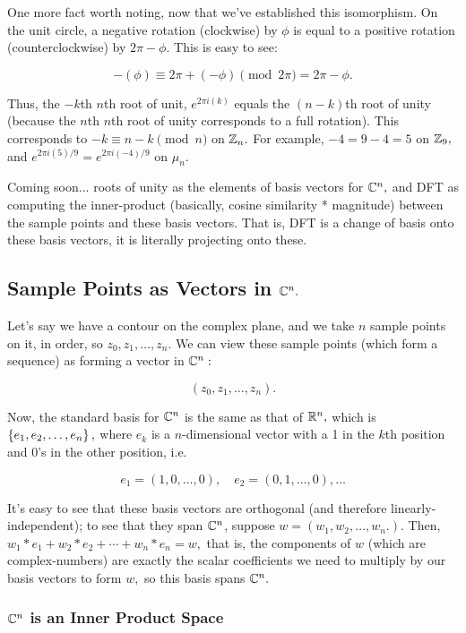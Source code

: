 \documentclass{article}
\begin{document}
One more fact worth noting, now that we've established this isomorphism. On the unit circle, a negative rotation (clockwise) by $\phi$ is equal to a positive rotation (counterclockwise) by $2 \pi - \phi.$ This is easy to see:

\[ -(\phi) \equiv 2 \pi + (-\phi) \pmod{2 \pi} = 2 \pi - \phi. \]

Thus, the $-k$th $n$th root of unit, $e^{2 \pi i (k)}$ equals the $(n - k)$th root of unity (because the $n$th $n$th root of unity corresponds to a full rotation). This corresponds to $-k \equiv n - k \pmod{n}$ on $\mathbb{Z}_n.$ For example, $-4 = 9 - 4 = 5$ on $\mathbb{Z}_9,$ and $e^{2 \pi i (5)/9} = e^{2 \pi i (-4)/9}$ on $\mu_{n}.$

Coming soon... roots of unity as the elements of basis vectors for $\mathbb{C}^n,$ and DFT as computing the \@{inner-product} (basically, cosine similarity * magnitude) between the sample points and these basis vectors. That is, DFT is a change of basis onto these basis vectors, it is literally projecting onto these.

\subsection{Sample Points as Vectors in $\mathbb{C}^n.$}

Let's say we have a contour on the complex plane, and we take $n$ sample points on it, in order, so $z_0, z_1, \dots, z_n.$ We can view these sample points (which form a \@{sequence}) as forming a \@{vector} in $\mathbb{C}^n:$

\[ ( z_0, z_1, \dots, z_n ). \]

Now, the standard basis for $\mathbb{C}^n$ is the same as that of $\mathbb{R}^n,$ which is $\left\{ e_1, e_2, \dots, e_n \right\},$ where $e_k$ is a $n$-dimensional vector with a 1 in the $k$th position and 0's in the other position, i.e.

\[ e_1 = ( 1, 0, \dots, 0 ), \quad e_2 = ( 0, 1, \dots, 0 ), \dots \]

It's easy to see that these basis vectors are \@{orthogonal} (and therefore \@{linearly-independent}); to see that they span $\mathbb{C}^n$, suppose $w = ( w_1, w_2, \dots, w_n. ).$ Then, $w_1 * e_1 + w_2 * e_2 + \cdots + w_n * e_n = w,$ that is, the \@{components} of $w$ (which are \@{complex-numbers}) are exactly the scalar coefficients we need to multiply by our basis vectors to form $w,$ so this basis spans $\mathbb{C}^n.$

\subsubsection{$\mathbb{C}^n$ is an Inner Product Space}
\end{document}
